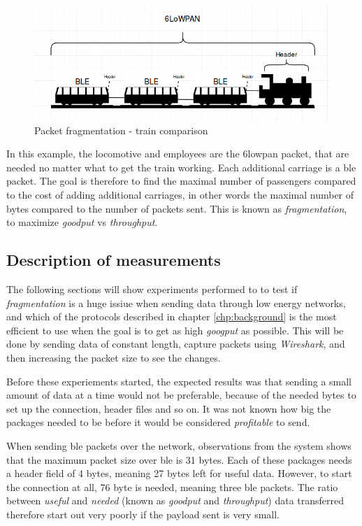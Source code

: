 \begin{figure}[ht]
    \centering
    \includegraphics[scale=0.5]{trainExample.png}    
    \caption{Packet fragmentation - train comparison}
    \label{fig:trainExample}
\end{figure}

In this example, the locomotive and employees are the \gls{6lowpan} packet, that are needed no matter what to get the train working. Each additional carriage is a \gls{ble} packet. The goal is therefore to find the maximal number of passengers compared to the cost of adding additional carriages, in other words the maximal number of bytes compared to the number of packets sent. This is known as \textit{fragmentation}, to maximize \textit{goodput} vs \textit{throughput}. 

\subsection{Description of measurements}

The following sections will show experiments performed to to test if \textit{fragmentation} is a huge issiue when sending data through low energy networks, and which of the protocols described in chapter \ref{chp:background}  is the most efficient to use when the goal is to get as high \textit{googput} as possible. This will be done by sending data of constant length, capture packets using \textit{Wireshark}, and then increasing the packet size to see the changes. 

Before these experiements started, the expected results was that sending a small amount of data at a time would not be preferable, because of the needed bytes to set up the connection, header files and so on. It was not known how big the packages needed to be before it would be considered \textit{profitable} to send. 

When sending \gls{ble} packets over the network, observations from the system shows that the maximum packet size over \gls{ble} is 31 bytes. Each of these packages needs a header field of 4 bytes, meaning 27 bytes left for useful data. However, to start the connection at all, 76 byte is needed, meaning three \gls{ble} packets. The ratio between \textit{useful} and \textit{needed} (known as \textit{goodput} and \textit{throughput}) data transferred therefore start out very poorly if the payload sent is very small.

